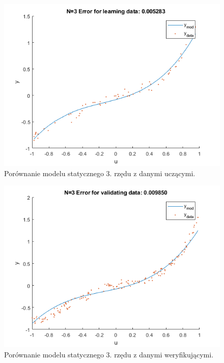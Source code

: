 \begin{figure}[H]
\centering
\includegraphics[width=15cm]{images/s5.png}
\caption{Porównanie modelu statycznego 3. rzędu z danymi uczącymi.}
\label{fig:s5}
\end{figure}
\begin{figure}[H]
\centering
\includegraphics[width=15cm]{images/s6.png}
\caption{Porównanie modelu statycznego 3. rzędu z danymi weryfikującymi.}
\label{fig:s6}
\end{figure}
